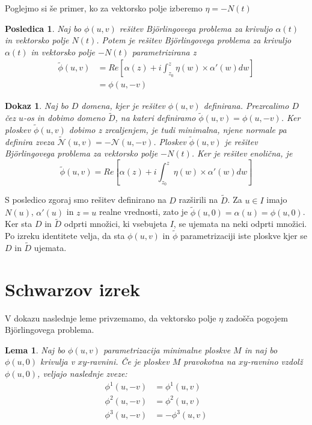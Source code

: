 \documentclass{article}
\newtheorem{lema}{Lema}
\newtheorem{dokaz}{Dokaz}
\newtheorem{posledica}{Posledica}
\begin{document}
        Poglejmo si še primer, ko za vektorsko polje izberemo $\eta = - N(t)$

        \begin{posledica}
            Naj bo $\phi (u, v)$ rešitev Björlingovega problema za krivuljo $\alpha (t)$ in vektorsko polje $N (t)$.
            Potem je rešitev Björlingovega problema za krivuljo $\alpha (t)$ in vektorsko polje $- N (t)$ parametrizirana z
            \begin{align*}
                \tilde{\phi} (u, v) &= Re \left[ \alpha(z) + i \int_{z_0}^{z} \eta (w) \times \alpha' (w) dw \right] \\
                &= \phi (u, - v)
            \end{align*}
        \end{posledica}

        \begin{dokaz}
            Naj bo $D$ domena, kjer je rešitev $\phi (u, v)$ definirana. Prezrcalimo $D$ čez $u$-os in dobimo domeno $\tilde{D}$,
            na kateri definiramo $\tilde{\phi} (u, v) = \phi (u, - v)$.
            Ker ploskev $\tilde{\phi} (u, v)$ dobimo z zrcaljenjem, je tudi minimalna, njene normale pa definira zveza 
            $\tilde{\mathcal{N}} (u, v) = - \mathcal{N} (u, -v)$. Ploskev $\tilde{\phi} (u, v)$ je rešitev Björlingovega problema
            za vektorsko polje $- N(t)$.
            Ker je rešitev enolična, je 
            $$ \tilde{\phi} (u, v) = Re \left[ \alpha(z) + i \int_{z_0}^{z} \eta (w) \times \alpha' (w) dw \right] $$
        \end{dokaz}

        S posledico zgoraj smo rešitev definirano na $D$ razširili na $\tilde{D}$. Za $u \in I$ imajo $N(u)$, $\alpha' (u)$ in $z = u$
        realne vrednosti, zato je $\tilde{\phi} (u, 0) = \alpha (u) = \phi (u, 0)$. Ker sta $D$ in $\tilde{D}$ odprti množici, ki vsebujeta
        $I$, se ujemata na neki odprti množici. Po izreku identitete velja, da sta $\phi (u, v)$ in $\tilde{\phi}$ parametrizaciji iste 
        ploskve kjer se $D$ in $\tilde{D}$ ujemata.


    \section{Schwarzov izrek}

        V dokazu naslednje leme privzemamo, da vektorsko polje $\eta$ zadošča pogojem Björlingovega problema.

        \begin{lema}
            Naj bo $\phi (u, v)$ parametrizacija minimalne ploskve $M$ in naj bo $\phi (u, 0)$ krivulja v $xy$-ravnini.
            Če je ploskev $M$ pravokotna na $xy$-ravnino vzdolž $\phi (u, 0)$, veljajo naslednje zveze:
            \begin{align*}
                \phi^{1} (u, - v) &= \phi^{1} (u, v) \\
                \phi^{2} (u, - v) &= \phi^{2} (u, v) \\
                \phi^{3} (u, - v) &= - \phi^{3} (u, v) \\ 
            \end{align*}
        \end{lema}
\end{document}
